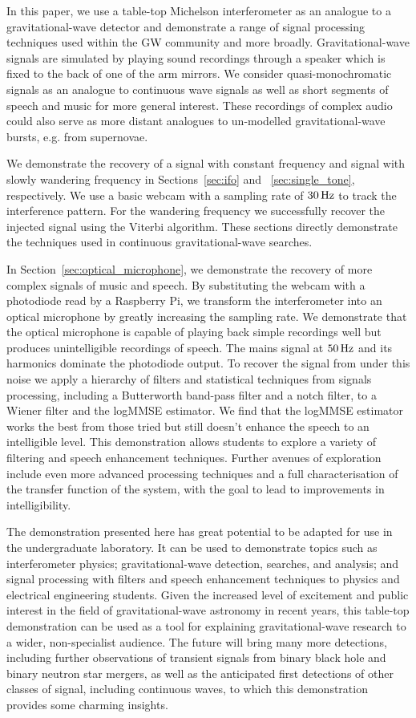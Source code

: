 \documentclass[paper-main.tex]{subfiles}
\begin{document}
In this paper, we use a table-top Michelson interferometer as an analogue to a gravitational-wave detector and demonstrate a range of signal processing techniques used within the GW community and more broadly. Gravitational-wave signals are simulated by playing sound recordings through a speaker which is fixed to the back of one of the arm mirrors. We consider quasi-monochromatic signals as an analogue to continuous wave signals as well as short segments of speech and music for more general interest. These recordings of complex audio could also serve as more distant analogues to un-modelled gravitational-wave bursts, e.g. from supernovae. 


We demonstrate the recovery of a signal with constant frequency and signal with slowly wandering frequency in Sections~\ref{sec:ifo} and ~\ref{sec:single_tone}, respectively. We use a basic webcam with a sampling rate of $30\,{\rm Hz}$ to track the interference pattern. For the wandering frequency we successfully recover the injected signal using the Viterbi algorithm. These sections directly demonstrate the techniques used in continuous gravitational-wave searches.  


In Section~\ref{sec:optical_microphone}, we demonstrate the recovery of more complex signals of music and speech. By substituting the webcam with a photodiode read by a Raspberry Pi, we transform the interferometer into an optical microphone by greatly increasing the sampling rate. We demonstrate that the optical microphone is capable of playing back simple recordings well but produces unintelligible recordings of speech. The mains signal at $50\,{\rm Hz}$ and its harmonics dominate the photodiode output. To recover the signal from under this noise we apply a hierarchy of filters and statistical techniques from signals processing, including a Butterworth band-pass filter and a notch filter, to a Wiener filter and the logMMSE estimator. We find that the logMMSE estimator works the best from those tried but still doesn’t enhance the speech to an intelligible level. This demonstration allows students to explore a variety of filtering and speech enhancement techniques. Further avenues of exploration include even more advanced processing techniques and a full characterisation of the transfer function of the system, with the goal to lead to improvements in intelligibility. 


The demonstration presented here has great potential to be adapted for use in the undergraduate laboratory. It can be used to demonstrate topics such as interferometer physics; gravitational-wave detection, searches, and analysis; and signal processing with filters and speech enhancement techniques to physics and electrical engineering students. Given the increased level of excitement and public interest in the field of gravitational-wave astronomy in recent years, this table-top demonstration can be used as a tool for explaining gravitational-wave research to a wider, non-specialist audience. The future will bring many more detections, including further observations of transient signals from binary black hole and binary neutron star mergers, as well as the anticipated first detections of other classes of signal, including continuous waves, to which this demonstration provides some charming insights.
\end{document}

